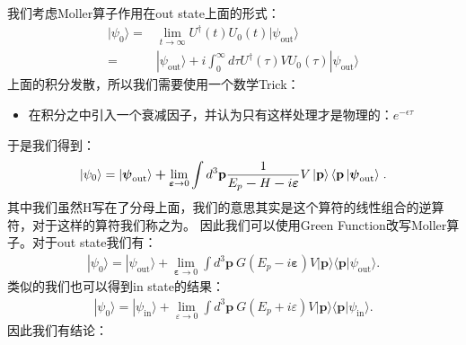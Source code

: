 我们考虑Moller算子作用在out state上面的形式：
\begin{align}
  |\psi_0\rangle= &\lim_{t \to \infty}
  U^\dagger(t)U_0(t)|\psi_{\mathrm{out}}\rangle \\
  = &|\psi_{\mathrm{out}}\rangle+i\int_0^\infty d\tau
  U^\dagger(\tau)VU_0(\tau)|\psi_{\mathrm{out}}\rangle
\end{align}
上面的积分发散，所以我们需要使用一个数学Trick：
\begin{itemize}
  \item 在积分之中引入一个衰减因子，并认为只有这样处理才是物理的：$ e^{-\epsilon \tau} $
\end{itemize}
于是我们得到：
\begin{align}
  \ket{\psi_0} =
  |\boldsymbol{\psi}_{\mathrm{out}}\rangle\boldsymbol{+}\lim_{\boldsymbol{\varepsilon}\to0}\int
  d^{3}\mathbf{p}\frac{1}{E_{p}\boldsymbol{-}H\boldsymbol{-}i\boldsymbol{\varepsilon}}V\left|\mathbf{p}\right\rangle\left\langle\mathbf{p}\left|\boldsymbol{\psi}_{\mathrm{out}}\right\rangle\right..
\end{align}
其中我们虽然H写在了分母上面，我们的意思其实是这个算符的线性组合的逆算符，对于这样的算符我们称之为。
因此我们可以使用Green Function改写Moller算子。对于out state我们有：
\begin{align}
  |\psi_0\rangle=|\psi_\mathrm{out}\rangle+\lim_{\boldsymbol{\varepsilon}\to0}\int
  d^3\mathbf{p}\ G(E_p-i\boldsymbol{\varepsilon})V|\mathbf{p}\rangle\langle\mathbf{p}|\psi_\mathrm{out}\rangle.
\end{align}
类似的我们也可以得到in state的结果：
\begin{align}
  |\psi_0\rangle=|\psi_{\mathrm{in}}\rangle+\lim_{\varepsilon\to0}\int
  d^3\mathbf{p}\ G(E_p+i\varepsilon)V|\mathbf{p}\rangle\langle\mathbf{p}|\psi_{\mathrm{in}}\rangle.
\end{align}
因此我们有结论：

